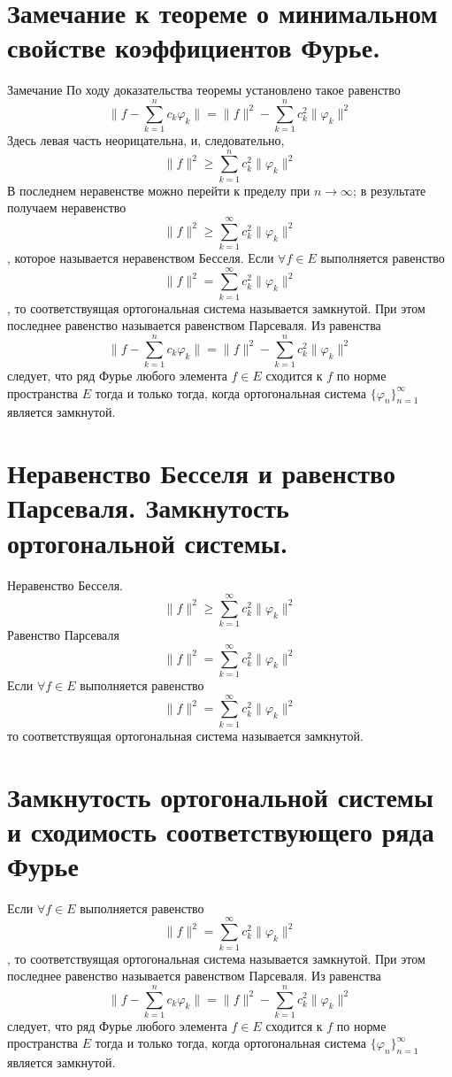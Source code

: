 \documentclass[12pt, a4paper]{article}
\begin{document}
\section{Замечание к теореме о минимальном свойстве коэффициентов Фурье.}
Замечание
\newline
По ходу доказательства теоремы установлено такое равенство
$$\|f - \sum\limits_{k=1}^{n}c_k \varphi_k\| = \|f\|^2 - \sum\limits_{k=1}^{n}c_k ^ 2 \| \varphi_k\|^2$$
Здесь левая часть неорицательна, и, следовательно, $$\|f\|^2 \geq \sum\limits_{k=1}^{n}c_k ^ 2 \| \varphi_k\|^2$$
В последнем неравенстве можно перейти к пределу при $n \to \infty$; в результате
получаем неравенство
$$\|f\|^2 \geq \sum\limits_{k=1}^{\infty}c_k ^ 2 \| \varphi_k\|^2$$,
которое называется неравенством Бесселя.
\newline
Если $\forall f \in E$ выполняется равенство 
$$\|f\|^2 = \sum\limits_{k=1}^{\infty}c_k ^ 2 \| \varphi_k\|^2$$,
то соответствуящая ортогональная система называется замкнутой. При этом
последнее равенство называется равенством Парсеваля.
\newline
Из равенства
$$\|f - \sum\limits_{k=1}^{n}c_k \varphi_k\| = \|f\|^2 - \sum\limits_{k=1}^{n}c_k ^ 2 \| \varphi_k\|^2$$
следует, что ряд Фурье любого элемента $f \in E$ сходится к $f$ по норме пространства
$E$ тогда и только тогда, когда ортогональная система $\{\varphi_n\}_{n=1}^{\infty}$
является замкнутой.

\section{Неравенство Бесселя и равенство Парсеваля. Замкнутость ортогональной системы.}
Неравенство Бесселя.
$$\|f\|^2 \geq \sum\limits_{k=1}^{\infty}c_k ^ 2 \| \varphi_k\|^2$$
Равенство Парсеваля
$$\|f\|^2 = \sum\limits_{k=1}^{\infty}c_k ^ 2 \| \varphi_k\|^2$$
Если $\forall f \in E$ выполняется равенство 
$$\|f\|^2 = \sum\limits_{k=1}^{\infty}c_k ^ 2 \| \varphi_k\|^2$$
то соответствуящая ортогональная система называется замкнутой. 
\section{Замкнутость ортогональной системы и сходимость соответствующего ряда Фурье}
Если $\forall f \in E$ выполняется равенство 
$$\|f\|^2 = \sum\limits_{k=1}^{\infty}c_k ^ 2 \| \varphi_k\|^2$$,
то соответствуящая ортогональная система называется замкнутой. При этом
последнее равенство называется равенством Парсеваля.
\newline
Из равенства
$$\|f - \sum\limits_{k=1}^{n}c_k \varphi_k\| = \|f\|^2 - \sum\limits_{k=1}^{n}c_k ^ 2 \| \varphi_k\|^2$$
следует, что ряд Фурье любого элемента $f \in E$ сходится к $f$ по норме пространства
$E$ тогда и только тогда, когда ортогональная система $\{\varphi_n\}_{n=1}^{\infty}$
является замкнутой.
\end{document}
